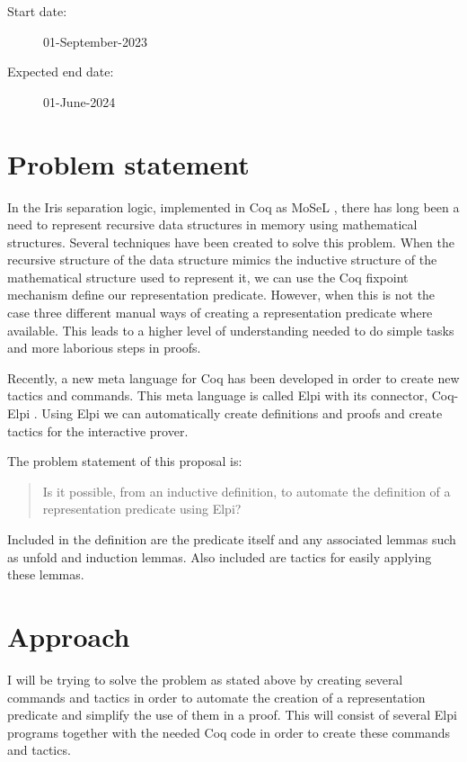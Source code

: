 \documentclass[11pt,a4paper,final]{report}
\begin{document}
\begin{description}
    \item[Start date:] 01-September-2023
    \item[Expected end date:] 01-June-2024
\end{description}

\section*{Problem statement}
In the Iris separation logic\cite*{jungIrisMonoidsInvariants2015a,jungHigherorderGhostState2016,krebbersEssenceHigherOrderConcurrent2017,jungIrisGroundModular2018}, implemented in Coq as MoSeL \cite*{krebbersInteractiveProofsHigherorder2017,krebbersMoSeLGeneralExtensible2018}, there has long been a need to represent recursive data structures in memory using mathematical structures. Several techniques have been created to solve this problem. When the recursive structure of the data structure mimics the inductive structure of the mathematical structure used to represent it, we can use the Coq fixpoint mechanism define our representation predicate. However, when this is not the case three different manual ways of creating a representation predicate where available. This leads to a higher level of understanding needed to do simple tasks and more laborious steps in proofs.

Recently, a new meta language for Coq has been developed in order to create new tactics and commands. This meta language is called Elpi with its connector, Coq-Elpi \cite{dunchevELPIFastEmbeddable2015,guidiImplementingTypeTheory2019}. Using Elpi we can automatically create definitions and proofs and create tactics for the interactive prover.

The problem statement of this proposal is:
\begin{quote}
    Is it possible, from an inductive definition, to automate the definition of a representation predicate using Elpi?
\end{quote}
Included in the definition are the predicate itself and any associated lemmas such as unfold and induction lemmas. Also included are tactics for easily applying these lemmas.

\section*{Approach}
I will be trying to solve the problem as stated above by creating several commands and tactics in order to automate the creation of a representation predicate and simplify the use of them in a proof. This will consist of several Elpi programs together with the needed Coq code in order to create these commands and tactics.
\end{document}
